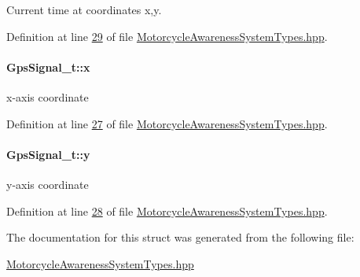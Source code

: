Current time at coordinates x,y. 



Definition at line \hyperlink{MotorcycleAwarenessSystemTypes_8hpp_source_l00029}{29} of file \hyperlink{MotorcycleAwarenessSystemTypes_8hpp_source}{Motorcycle\-Awareness\-System\-Types.\-hpp}.

\hypertarget{structGpsSignal__t_a6f7bd3c500b55923ab335ada4b6b26eb}{
\paragraph[{x}]{ Gps\-Signal\-\_\-t\-::x}}\label{structGpsSignal__t_a6f7bd3c500b55923ab335ada4b6b26eb}


x-\/axis coordinate 



Definition at line \hyperlink{MotorcycleAwarenessSystemTypes_8hpp_source_l00027}{27} of file \hyperlink{MotorcycleAwarenessSystemTypes_8hpp_source}{Motorcycle\-Awareness\-System\-Types.\-hpp}.

\hypertarget{structGpsSignal__t_ab9e083be189fc842ed7aa4fdc978e94e}{
\paragraph[{y}]{ Gps\-Signal\-\_\-t\-::y}}\label{structGpsSignal__t_ab9e083be189fc842ed7aa4fdc978e94e}


y-\/axis coordinate 



Definition at line \hyperlink{MotorcycleAwarenessSystemTypes_8hpp_source_l00028}{28} of file \hyperlink{MotorcycleAwarenessSystemTypes_8hpp_source}{Motorcycle\-Awareness\-System\-Types.\-hpp}.



The documentation for this struct was generated from the following file\-:\begin{DoxyCompactItemize}
\item 
\hyperlink{MotorcycleAwarenessSystemTypes_8hpp}{Motorcycle\-Awareness\-System\-Types.\-hpp}\end{DoxyCompactItemize}

